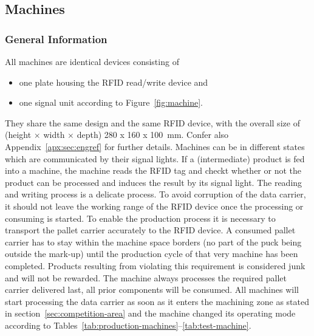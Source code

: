 \documentclass[12pt,twoside]{article}
\begin{document}
\subsection{Machines}
\label{sec:machines}

\subsubsection{General Information}


All machines are identical devices consisting of 
\begin{itemize}
\item one plate housing the RFID read/write device and
\item one signal unit according to Figure~\ref{fig:machine}.
\end{itemize}

They share the same design and the same RFID device, with the overall
size of (height $\times$ width $\times$ depth) \SI{280 x 160 x
100}{\milli\metre}. Confer also Appendix~\ref{apx:sec:engref} for further
details. Machines can be in different states which are communicated by their
signal lights. If a (intermediate) product is fed into a machine, the machine
reads the RFID tag and checkt whether or not the product can be processed and
induces the result by its signal light. The reading and writing process is a
delicate process. To avoid corruption of the data carrier, it should not leave
the working range of the RFID device once the processing or consuming is
started. To enable the production process it is necessary to transport the
pallet carrier accurately to the RFID device. A consumed pallet carrier has to
stay within the machine space borders (no part of the puck being outside the
mark-up) until the production cycle of that very machine has been completed.
Products resulting from violating this requirement is considered junk and will
not be rewarded. The machine always processes the required pallet carrier
delivered last, all prior components will be consumed. All machines will start
processing the data carrier as soon as it enters the machining zone as stated in
section~\ref{sec:competition-area} and the machine changed its operating mode
according to Tables~\ref{tab:production-machines}--\ref{tab:test-machine}.
\end{document}
